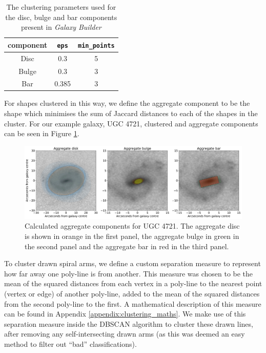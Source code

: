 \documentclass[../main.tex]{subfiles}
\begin{document}
\begin{table}
  \centering
  \begin{tabular}{ |c|c|c| }
    \hline
    component & \texttt{eps} & \texttt{min\_points} \\
    \hline
    Disc & 0.3 & 5 \\
    Bulge & 0.3 & 3 \\
    Bar & 0.385 & 3 \\
    \hline
  \end{tabular}
  \caption{The clustering parameters used for the disc, bulge and bar components present in \textit{Galaxy Builder}}
  \label{table:dbscan_params}
\end{table}

For shapes clustered in this way, we define the aggregate component to be the shape which minimises the sum of Jaccard distances to each of the shapes in the cluster. For our example galaxy, UGC 4721, clustered and aggregate components can be seen in Figure \ref{fig:mean_shapes}.

\begin{figure}
  \includegraphics[width=17.3cm]{images__method/mean_shapes.pdf}
  \caption{Calculated aggregate components for UGC 4721. The aggregate disc is shown in orange in the first panel, the aggregate bulge in green in the second panel and the aggregate bar in red in the third panel.}
  \label{fig:mean_shapes}
\end{figure}

To cluster drawn spiral arms, we define a custom separation measure to represent how far away one poly-line is from another. This measure was chosen to be the mean of the squared distances from each vertex in a poly-line to the nearest point (vertex or edge) of another poly-line, added to the mean of the squared distances from the second poly-line to the first. A mathematical description of this measure can be found in Appendix \ref{appendix:clustering_maths}. We make use of this separation measure inside the DBSCAN algorithm to cluster these drawn lines, after removing any self-intersecting drawn arms (as this was deemed an easy method to filter out ``bad'' classifications).
\end{document}
